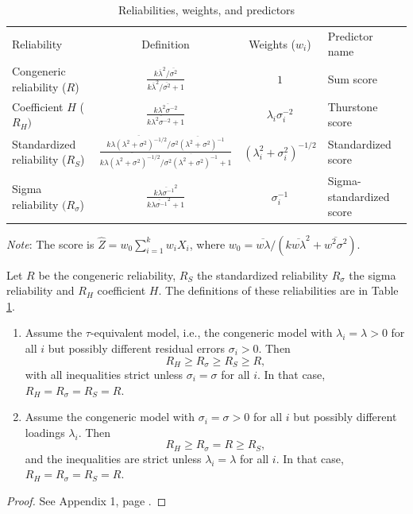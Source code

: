 \documentclass[twoside]{article}
\begin{document}
\begin{table}
\label{tab:reliabilities_}
\noindent \begin{centering}
\caption{Reliabilities, weights, and predictors}
\begin{tabular}{lccl}
\toprule
 Reliability & Definition & Weights ($w_{i}$) & Predictor name\\
 \cmidrule{1-4}
Congeneric reliability ($R$) & $\frac{k\overline{\lambda}^{2}/\overline{\sigma^{2}}}{k\overline{\lambda}^{2}/\overline{\sigma^{2}}+1}$ & $1$ & Sum score \\[2ex]
Coefficient $H$ ($R_{H})$ & $\frac{k\overline{\lambda^{2}\sigma^{-2}}}{k\overline{\lambda^{2}\sigma^{-2}}+1}$ & $\lambda_{i}\sigma_{i}^{-2}$ & Thurstone score \\[2ex]
Standardized reliability ($R_{S}$) & $\frac{k\overline{\lambda(\lambda^{2}+\sigma^{2})^{-1/2}}/\overline{\sigma^{2}(\lambda^{2}+\sigma^{2})^{-1}}}{k\overline{\lambda(\lambda^{2}+\sigma^{2})^{-1/2}}/\overline{\sigma^{2}(\lambda^{2}+\sigma^{2})^{-1}}+1}$ & $(\lambda_{i}^{2}+\sigma_{i}^{2})^{-1/2}$ & Standardized score \\[2ex]
Sigma reliability $(R_{\sigma}$) & $\frac{k\overline{\lambda\sigma^{-1}}^{2}}{k\overline{\lambda\sigma^{-1}}^{2}+1}$ & $\sigma_{i}^{-1}$ & Sigma-standardized score \\[2ex]
\bottomrule
\end{tabular}
\par\end{centering}
\vskip7.0pt
\textit{Note}: The score is $\hat{Z} = w_{0}\sum_{i=1}^{k}w_iX_{i}$, where $w_0 = \overline{w\lambda}/(k\overline{w\lambda}^{2}+\overline{w^{2}\sigma^{2}})$.
\end{table}


\begin{thm}
\label{thm:Properties of three} Let $ R$ be the congeneric
reliability, $ R_{S}$ the standardized reliability 
$ R_{\sigma}$ the sigma reliability 
and $ R_{H}$ coefficient $H$. The definitions of these reliabilities are in Table \ref{tab:reliabilities_}.

\begin{enumerate}[label=(\roman*)]
\item Assume the $\tau$-equivalent model,
i.e., the congeneric model with $\lambda_{i}=\lambda>0$ for all $i$
but possibly different residual errors $\sigma_{i}>0$. Then
\[
 R_{H}\geq R_{\sigma}\geq R_{S}\geq R,
\]
with all inequalities strict unless $\sigma_{i}=\sigma$ for all
$i$. In that case, $ R_{H} =  R_{\sigma} =  R_{S} =  R$.
\item Assume the congeneric model with $\sigma_i = \sigma > 0$ for all $i$ but possibly different loadings $\lambda_i$. Then
\[
 R_{H}\geq R_{\sigma}= R\geq R_{S},
\]
and the inequalities are strict unless $\lambda_{i}=\lambda$ for all
$i$. In that case, $ R_{H} =  R_{\sigma} =  R_{S} =  R$.

\end{enumerate}

\end{thm}
\begin{proof}
See Appendix 1, page \pageref{proof:Properties}.
\end{proof}
\end{document}
